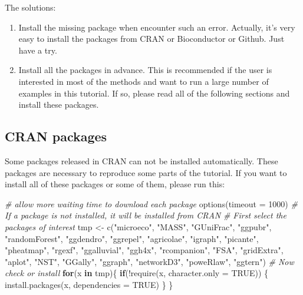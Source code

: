 \documentclass[
]{book}
\newenvironment{Shaded}{\begin{snugshade}}{\end{snugshade}}
\newcommand{\AttributeTok}[1]{\textcolor[rgb]{0.77,0.63,0.00}{#1}}
\newcommand{\CommentTok}[1]{\textcolor[rgb]{0.56,0.35,0.01}{\textit{#1}}}
\newcommand{\ConstantTok}[1]{\textcolor[rgb]{0.00,0.00,0.00}{#1}}
\newcommand{\ControlFlowTok}[1]{\textcolor[rgb]{0.13,0.29,0.53}{\textbf{#1}}}
\newcommand{\DecValTok}[1]{\textcolor[rgb]{0.00,0.00,0.81}{#1}}
\newcommand{\FunctionTok}[1]{\textcolor[rgb]{0.00,0.00,0.00}{#1}}
\newcommand{\NormalTok}[1]{#1}
\newcommand{\OtherTok}[1]{\textcolor[rgb]{0.56,0.35,0.01}{#1}}
\newcommand{\SpecialCharTok}[1]{\textcolor[rgb]{0.00,0.00,0.00}{#1}}
\newcommand{\StringTok}[1]{\textcolor[rgb]{0.31,0.60,0.02}{#1}}
\begin{document}
The solutions:

\begin{enumerate}
\def\labelenumi{\arabic{enumi}.}
\item
  Install the missing package when encounter such an error. Actually, it's very easy to install the packages from CRAN or Bioconductor or Github. Just have a try.
\item
  Install all the packages in advance.
  This is recommended if the user is interested in most of the methods and want to run a large number of examples in this tutorial.
  If so, please read all of the following sections and install these packages.
\end{enumerate}

\hypertarget{cran-packages}{%
\subsection{CRAN packages}\label{cran-packages}}

Some packages released in CRAN can not be installed automatically.
These packages are necessary to reproduce some parts of the tutorial.
If you want to install all of these packages or some of them, please run this:

\begin{Shaded}
\begin{Highlighting}[]
\CommentTok{\# allow more waiting time to download each package}
\FunctionTok{options}\NormalTok{(}\AttributeTok{timeout =} \DecValTok{1000}\NormalTok{)}
\CommentTok{\# If a package is not installed, it will be installed from CRAN}
\CommentTok{\# First select the packages of interest}
\NormalTok{tmp }\OtherTok{\textless{}{-}} \FunctionTok{c}\NormalTok{(}\StringTok{"microeco"}\NormalTok{, }\StringTok{"MASS"}\NormalTok{, }\StringTok{"GUniFrac"}\NormalTok{, }\StringTok{"ggpubr"}\NormalTok{, }\StringTok{"randomForest"}\NormalTok{, }\StringTok{"ggdendro"}\NormalTok{, }\StringTok{"ggrepel"}\NormalTok{, }\StringTok{"agricolae"}\NormalTok{, }\StringTok{"igraph"}\NormalTok{, }\StringTok{"picante"}\NormalTok{, }\StringTok{"pheatmap"}\NormalTok{, }\StringTok{"rgexf"}\NormalTok{, }
    \StringTok{"ggalluvial"}\NormalTok{, }\StringTok{"ggh4x"}\NormalTok{, }\StringTok{"rcompanion"}\NormalTok{, }\StringTok{"FSA"}\NormalTok{, }\StringTok{"gridExtra"}\NormalTok{, }\StringTok{"aplot"}\NormalTok{, }\StringTok{"NST"}\NormalTok{, }\StringTok{"GGally"}\NormalTok{, }\StringTok{"ggraph"}\NormalTok{, }\StringTok{"networkD3"}\NormalTok{, }\StringTok{"poweRlaw"}\NormalTok{, }\StringTok{"ggtern"}\NormalTok{)}
\CommentTok{\# Now check or install}
\ControlFlowTok{for}\NormalTok{(x }\ControlFlowTok{in}\NormalTok{ tmp)\{}
    \ControlFlowTok{if}\NormalTok{(}\SpecialCharTok{!}\FunctionTok{require}\NormalTok{(x, }\AttributeTok{character.only =} \ConstantTok{TRUE}\NormalTok{)) \{}
        \FunctionTok{install.packages}\NormalTok{(x, }\AttributeTok{dependencies =} \ConstantTok{TRUE}\NormalTok{)}
\NormalTok{    \}}
\NormalTok{\}}
\end{Highlighting}
\end{Shaded}
\end{document}
